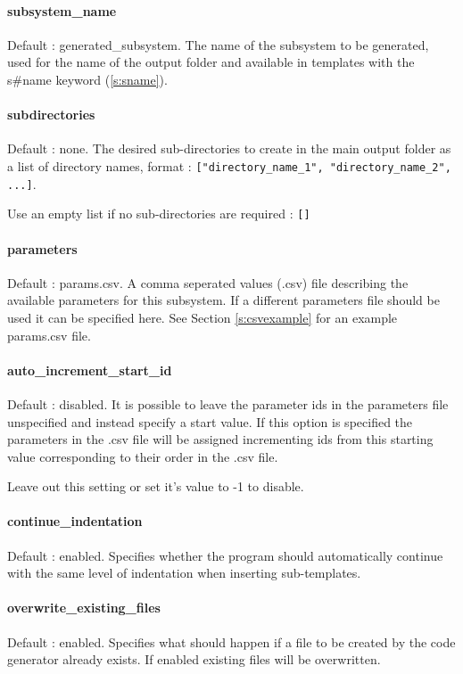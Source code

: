 \documentclass{settings/TU_Delft_Report}
\begin{document}
\paragraph{subsystem\_name} Default : generated\_subsystem. The name of the subsystem to be generated, used for the name of the output folder and available in templates with the s\#name keyword (\ref{s:sname}).

\paragraph{subdirectories} Default : none. The desired sub-directories to create in the main output folder as a list of directory names, format : \lstinline{["directory_name_1", "directory_name_2", ...]}.

Use an empty list if no sub-directories are required : \lstinline{[]}

\paragraph{parameters} Default : params.csv. A comma seperated values (.csv) file describing the available parameters for this subsystem. If a different parameters file should be used it can be specified here. See Section \ref{s:csvexample} for an example params.csv file.

\paragraph{auto\_increment\_start\_id} Default : disabled. It is possible to leave the parameter ids in the parameters file unspecified and instead specify a start value. If this option is specified the parameters in the .csv file will be assigned incrementing ids from this starting value corresponding to their order in the .csv file.

Leave out this setting or set it's value to -1 to disable.

\paragraph{continue\_indentation} Default : enabled. Specifies whether the program should automatically continue with the same level of indentation when inserting sub-templates.

\paragraph{overwrite\_existing\_files} Default : enabled. Specifies what should happen if a file to be created by the code generator already exists. If enabled existing files will be overwritten.
\end{document}
